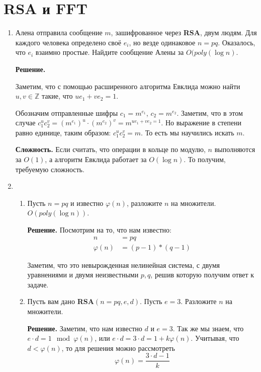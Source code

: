 \section*{RSA и FFT}
\begin{enumerate}
	\item Алена отправила сообщение $m$, зашифрованное через \textbf{RSA}, двум людям. Для каждого человека 
	определено своё $e_i$, но везде одинаковое $n = pq$. Оказалось, что $e_i$ взаимно простые. Найдите сообщение 
	Алены за $O(poly(\log n)$.
	
	\textbf{Решение.} 
	
	Заметим, что с помощью расширенного алгоритма Евклида можно найти $u, v \in \mathbb{Z}$ такие, что $ue_1 + 
	ve_2 = 1$.
	
	Обозначим отправленные шифры $c_1 = m^{e_1}$, $c_2 = m^{e_2}$. Заметим, что в этом случае $c_1^u c_2^v = 
	(m^{e_1})^u\cdot(m^{e_2})^v = m^{ue_1 + ve_2 = 1}$. Но выражение в степени равно единице, таким образом: 
	$c_1^u c_2^v = m$. То есть мы научились искать $m$.
	
 	\textbf{Сложность.} Если считать, что операции в кольце по модулю, $n$ выполняются за $O(1)$, а алгоритм 
 	Евклида работает за $O(\log n)$. То получим, требуемую сложность.
	
	\item 
	\begin{enumerate}
		\item Пусть $n = pq$ и известно $\varphi(n)$, разложите $n$ на множители. $O(poly(\log n))$.
		
		\textbf{Решение.} Посмотрим на то, что нам известно:
		\begin{align*}
			n &= pq \\
			\varphi(n) &= (p - 1) * (q - 1)
		\end{align*} 
		
		Заметим, что это невырожденная нелинейная система, с двумя уравнениями и двумя неизвестными $p, q$, решив 
		которую получим ответ к задаче. 
			
		\item Пусть вам дано \textbf{RSA}$(n = pq, e, d)$. Пусть $e = 3$. Разложите $n$ на множители.
		
		\textbf{Решение.}
		Заметим, что нам известно $d$ и $e = 3$. Так же мы знаем, что $e\cdot d = 1\mod \varphi(n)$, или $e\cdot 
		d = 3\cdot d = 1 + k \varphi(n)$. Учитывая, что $d < \varphi(n)$, то для решения можно рассмотреть
		\begin{equation*}
			\varphi(n) = \frac{3\cdot d - 1}{k}
		\end{equation*}
		

\end{enumerate}
\end{enumerate}

